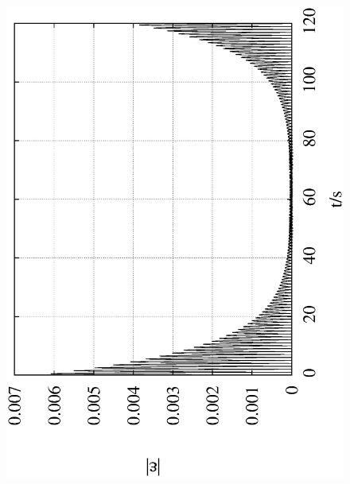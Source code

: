 \documentclass[10pt,a4paper]{article}
\begin{document}
\begin{figure}[h!]
\begin{center}
\includegraphics[scale = 0.3, angle =-90]{./Leapfrog_0.001_400000_0.2.eps}

\end{center}
\end{figure}
\end{document}
